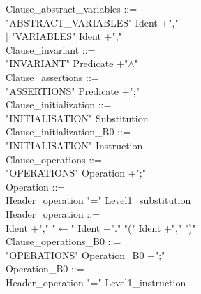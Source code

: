 \documentclass[12pt,a4paper,draft]{article}
\begin{document}
{\begin{sloppypar}
Clause\_abstract\_variables ::= \\
\hspace*{0.20in}  "ABSTRACT\_VARIABLES"  Ident +","\\
\hspace*{0.20in} $|$ "VARIABLES" Ident +","\\
Clause\_invariant ::= \\
\hspace*{0.20in}  "INVARIANT"  Predicate +"$\land$"\\
Clause\_assertions ::= \\
\hspace*{0.20in}  "ASSERTIONS" Predicate +";"\\
Clause\_initialization ::= \\
\hspace*{0.20in}  "INITIALISATION" Substitution\\
Clause\_initialization\_B0 ::= \\
\hspace*{0.20in}  "INITIALISATION" Instruction\\
Clause\_operations ::= \\
\hspace*{0.20in}  "OPERATIONS"  Operation +";"\\
Operation ::= \\
\hspace*{0.20in}   Header\_operation  "="  Level1\_substitution\\
   
\noindent Header\_operation ::= \\
\hspace*{0.20in}  Ident +","  "$\leftarrow$"   Ident +"."   "(" Ident +"," ")"  \\  %
Clause\_operations\_B0 ::= \\
\hspace*{0.20in}  "OPERATIONS"  Operation\_B0 +";"\\
Operation\_B0 ::= \\
\hspace*{0.20in}   Header\_operation  "="  Level1\_instruction\\
   

\end{sloppypar}}
\end{document}
